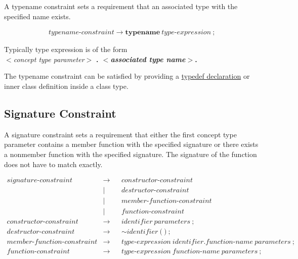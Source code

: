 \documentclass[a4paper,oneside,11pt]{article}
\begin{document}
A typename constraint sets a requirement that an associated type with the specified name exists.

\begin{align*}
typename\textrm{-}constraint \rightarrow \textbf{typename} \> \hyperref[typeexpr]{type\textrm{-}expression} \> \texttt{;}
\end{align*}

Typically type expression is of the form\\
\emph{$<$concept type parameter$>$} \bf{.} \emph{$<$associated type name$>$}.

The typename constraint can be satisfied by providing a \hyperref[typedefdeclaration]{typedef declaration} or inner class definition inside a
class type.

\subsection{Signature Constraint}\label{signatureconstraint}

A signature constraint sets a requirement that either the first concept type parameter contains a member function with the specified signature or there exists a nonmember function with the specified signature.
The signature of the function does not have to match exactly.

\begin{align*}
signature\textrm{-}constraint &\rightarrow & &constructor\textrm{-}constraint\\
&| & &destructor\textrm{-}constraint\\
&| & &member\textrm{-}function\textrm{-}constraint\\
&| & &function\textrm{-}constraint\\
constructor\textrm{-}constraint &\rightarrow & &\hyperref[identifier]{identifier} \> \hyperref[parameters]{parameters} \> \texttt{;}\\
destructor\textrm{-}constraint &\rightarrow & &\sim \hyperref[identifier]{identifier} \> \texttt{(} \> \texttt{)} \> \texttt{;}\\
member\textrm{-}function\textrm{-}constraint &\rightarrow & &\hyperref[typeexpr]{type\textrm{-}expression} \>
\hyperref[identifier]{identifier} \texttt{.} \hyperref[functionname]{function\textrm{-}name} \> \hyperref[parameters]{parameters} \> \texttt{;}\\
function\textrm{-}constraint &\rightarrow & &\hyperref[typeexpr]{type\textrm{-}expression} \> \hyperref[functionname]{function\textrm{-}name} \>
\hyperref[parameters]{parameters} \>\texttt{;}
\end{align*}
\end{document}

